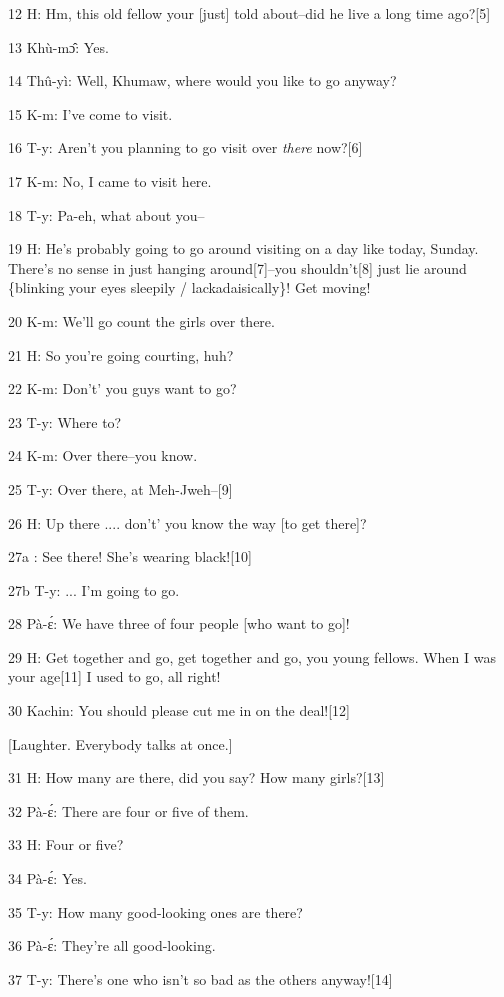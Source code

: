 
12 H: Hm, this old fellow your [just] told about--did he live a long time ago?[5]

13 Khù-mɔ̂: Yes.

14 Thû-yì: Well, Khumaw, where would you like to go anyway?

15 K-m: I've come to visit.

16 T-y: Aren't you planning to go visit over \textit{there} now?[6]

17 K-m: No, I came to visit here.

18 T-y: Pa-eh, what about you--

19 H: He's probably going to go around visiting on a day like today, Sunday. There's
no sense in just hanging around[7]--you shouldn't[8] just lie around \{blinking
your eyes sleepily / lackadaisically\}! Get moving!

20 K-m: We'll go count the girls over there.

21 H: So you're going courting, huh?

22 K-m: Don't' you guys want to go?

23 T-y: Where to?

24 K-m: Over there--you know.

25 T-y: Over there, at Meh-Jweh--[9]

26 H: Up there .... don't' you know the way [to get there]?

27a  : See there! She's wearing black![10]

27b T-y: ... I'm going to go.

28 Pà-ɛ́: We have three of four people [who want to go]!

29 H: Get together and go, get together and go, you young fellows. When I was your
age[11] I used to go, all right!

30 Kachin: You should please cut me in on the deal![12]

\begin{center}
[Laughter. Everybody talks at once.]
\end{center}

\leftskip=0pt
31 H: How many are there, did you say? How many girls?[13]

32 Pà-ɛ́: There are four or five of them.

33 H: Four or five?

34 Pà-ɛ́: Yes.

35 T-y: How many good-looking ones are there?

36 Pà-ɛ́: They're all good-looking.

37 T-y: There's one who isn't so bad as the others anyway![14]

